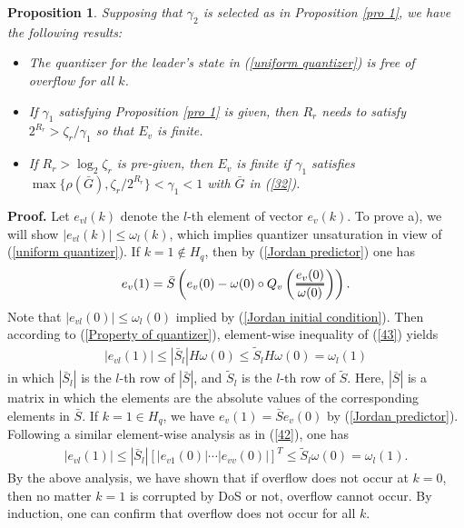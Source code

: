 \documentclass{autart}
\newtheorem{itproposition}{Proposition}
\newenvironment{proposition}{\begin{itproposition}\rm}{\end{itproposition}}
\newcommand{\efrac}[2]{%
	\mathchoice
	{\ooalign{%
			$\genfrac{}{}{1.8pt}0{\hphantom{#1}}{\hphantom{#2}}$\cr%
			$\color{white}\genfrac{}{}{.6pt}0{\color{black}#1}{\color{black}#2}$}}%
	{\ooalign{%
			$\genfrac{}{}{1.8pt}1{\hphantom{#1}}{\hphantom{#2}}$\cr%
			$\color{white}\genfrac{}{}{.6pt}1{\color{black}#1}{\color{black}#2}$}}%
	{\ooalign{%
			$\genfrac{}{}{1.8pt}2{\hphantom{#1}}{\hphantom{#2}}$\cr%
			$\color{white}\genfrac{}{}{.6pt}2{\color{black}#1}{\color{black}#2}$}}%
	{\ooalign{%
			$\genfrac{}{}{1.8pt}3{\hphantom{#1}}{\hphantom{#2}}$\cr%
			$\color{white}\genfrac{}{}{.6pt}3{\color{black}#1}{\color{black}#2}$}}%
}
\begin{document}
\begin{proposition}\label{theorem 1}
	Supposing that $\gamma_2$ is selected as in Proposition \ref{pro 1}, we have the following results:
	\begin{itemize}
		\item[a)] The quantizer for the leader's state in (\ref{uniform quantizer}) is free of overflow for all $k$. 
		\item[b)] If $\gamma_1$ satisfying Proposition \ref{pro 1} is given, then $R_r$ needs to satisfy $2^{R_r} > \zeta_r /\gamma_1$ so that $E_v$ is finite.
		\item[c)] If $R_r > \log_2 \zeta_r$ is pre-given, then $E_v$ is finite if $\gamma_1$ satisfies $\max \{ \rho(\bar G), \zeta_r / 2^{R_r} \} < \gamma_1<1$ with  $\bar G$ in (\ref{32}).  
	\end{itemize}
\end{proposition}
%


\textbf{Proof.} Let $e_{vl}(k)$ denote the $l$-th element of vector $e_{v}(k)$. To prove a), we will show $|e_{vl}  (k)| \le \omega_l(k)$, which implies quantizer unsaturation in view of (\ref{uniform quantizer}). If $k=1 \notin H_q$, then by (\ref{Jordan predictor}) one has 
\begin{align}\label{43}
e_v   (1)= \bar S   \left(   e_v   (0) - \omega(0)  \circ  Q_v \left( \efrac{ e_v   (0)}{\omega (0)} \right)         \right).
\end{align}
Note that $|e_{vl} (0)| \le \omega_l(0)$ implied by (\ref{Jordan initial condition}). Then according to (\ref{Property of quantizer}), element-wise inequality of (\ref{43}) yields 
\begin{align}\label{42}
|e_{vl} (1)| \le |\bar S_l|  H \omega(0) \le  \tilde S_l  H \omega(0)  = \omega_l (1)
\end{align}
in which $|\bar S_l|$ is the $l$-th row of $|\bar S|$, and $\tilde S _l$ is the $l$-th row of $\tilde S$. Here, $|\bar S|$ is a matrix in which the elements are the absolute values of the corresponding elements in $\bar S$. 
If $k=1 \in H_q$, we have $e_v (1) = \bar S e_v(0)$ by (\ref{Jordan predictor}). Following a similar element-wise analysis as in (\ref{42}), one has 
\begin{align}
\!\!\!\! |e_{vl} (1)| \!\le\! |\bar S_l| [|e_{v1}(0)| \cdots |e_{vv}(0)|]^T  \!\le\! \tilde S _l   \omega(0) \!=\! \omega_l(1).
\end{align}
By the above analysis, we have shown that if overflow does not occur at $k=0$, then no matter $k=1$ is corrupted by DoS or not, overflow cannot occur. By induction, one can confirm that overflow does not occur for all $k$.
\end{document}
